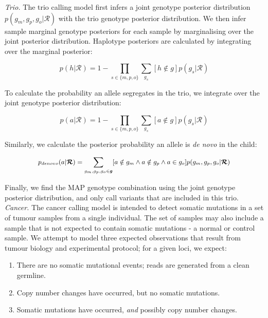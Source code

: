 \documentclass[notitlepage, twocolumn]{article}
\begin{document}
\emph{Trio.} The trio calling model first infers a joint genotype posterior distribution $p(g_m, g_p, g_o | \boldsymbol{\mathcal{R}})$ with the trio genotype posterior distribution. We then infer sample marginal genotype posteriors for each sample by marginalising over the joint posterior distribution. Haplotype posteriors are calculated by integrating over the marginal posterior:

\begin{equation*}
p(h | \boldsymbol{\mathcal{R}}) = 1 - \prod_{s \in \{m, p, o\}}\sum_{g_s} [h \notin g]p(g_s | \boldsymbol{\mathcal{R}})
\end{equation*}

To calculate the probability an allele segregates in the trio, we integrate over the joint genotype posterior distribution:

\begin{equation*}
p(a | \boldsymbol{\mathcal{R}}) = 1 - \prod_{s \in \{m, p, o\}}\sum_{g_s} [a \notin g]p(g_s | \boldsymbol{\mathcal{R}})
\end{equation*}

Similarly, we calculate the posterior probability an allele is \textit{de novo} in the child:

\begin{equation*}
\small
p_{denovo}(a | \boldsymbol{\mathcal{R}}) = \sum_{g_m, g_p, g_o \in \boldsymbol{g}} [a \notin g_m \land a \notin g_p \land a \in g_o] p(g_m, g_p, g_o | \boldsymbol{\mathcal{R}})
\end{equation*}

Finally, we find the MAP genotype combination using the joint genotype posterior distribution, and only call variants that are included in this trio. \\

\emph{Cancer.} The cancer calling model is intended to detect somatic mutations in a set of tumour samples from a single individual. The set of samples may also include a sample that is not expected to contain somatic mutations - a normal or control sample. We attempt to model three expected observations that result from tumour biology and experimental protocol; for a given loci, we expect: 

\begin{enumerate}[i]
	\item There are no somatic mutational events; reads are generated from a clean germline.
	\item Copy number changes have occurred, but no somatic mutations.
    \item Somatic mutations have occurred, \emph{and} possibly copy number changes.
\end{enumerate}
\end{document}
